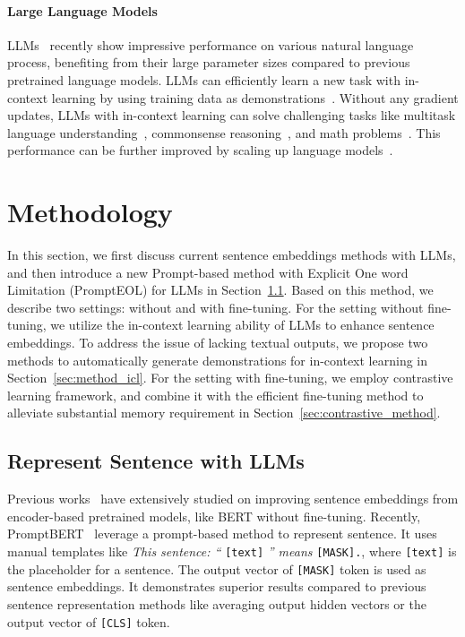 \documentclass{article}
\begin{document}
\paragraph{Large Language Models}
LLMs~\cite{zhang2022opt,bloom,chowdhery2022palm,touvron2023llama} recently show impressive performance on various natural language process, benefiting from their large parameter sizes compared to previous pretrained language models.
LLMs can efficiently learn a new task with in-context learning by using training data as demonstrations~\cite{gpt3}.
Without any gradient updates, LLMs with in-context learning can solve challenging tasks like multitask language understanding~\cite{hendrycks2020measuring}, commonsense reasoning~\cite{lin2021truthfulqa}, and math problems~\cite{cobbe2021training}.
This performance can be further improved by scaling up language models~\cite{hoffmann2022training, kaplan2020scaling}.

\section{Methodology}
In this section, we first discuss current sentence embeddings methods with LLMs, and then introduce a new Prompt-based method with Explicit One word Limitation (PromptEOL) for LLMs in Section~\ref{sec:represent_llm}.
Based on this method, we describe two settings: without and with fine-tuning.
For the setting without fine-tuning,
we utilize the in-context learning ability of LLMs to enhance sentence embeddings.
To address the issue of  lacking textual outputs, we propose two methods to automatically generate demonstrations for in-context learning in Section~\ref{sec:method_icl}.
For the setting with fine-tuning, we employ contrastive learning framework, and combine it with the efficient fine-tuning method to alleviate substantial memory requirement in Section~\ref{sec:contrastive_method}.

\subsection{Represent Sentence with LLMs}
\label{sec:represent_llm}
Previous works~\cite{li2020sentence, su2021whitening, jiang2022promptbert} have extensively studied on improving sentence embeddings from  encoder-based pretrained models, like BERT without fine-tuning.
Recently, PromptBERT~\cite{jiang2022promptbert} leverage a prompt-based method to represent sentence.
It uses manual templates like \textit{This sentence: ``} \texttt{[text]} \textit{'' means} \texttt{[MASK].}, where \texttt{[text]} is the placeholder for a sentence. The output vector of \texttt{[MASK]} token is used as sentence embeddings.
It demonstrates superior results compared to previous sentence representation methods like averaging output hidden vectors or the output vector of \texttt{[CLS]} token.
\end{document}
